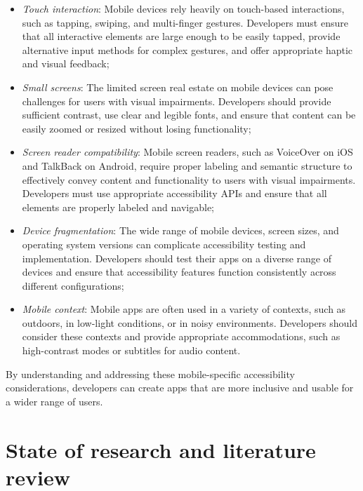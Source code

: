 \begin{itemize}
    \item \textit{Touch interaction}: Mobile devices rely heavily on touch-based interactions, such as tapping, swiping, and multi-finger gestures. Developers must ensure that all interactive elements are large enough to be easily tapped, provide alternative input methods for complex gestures, and offer appropriate haptic and visual feedback;
    
    \item \textit{Small screens}: The limited screen real estate on mobile devices can pose challenges for users with visual impairments. Developers should provide sufficient contrast, use clear and legible fonts, and ensure that content can be easily zoomed or resized without losing functionality;
    
    \item \textit{Screen reader compatibility}: Mobile screen readers, such as VoiceOver on iOS and TalkBack on Android, require proper labeling and semantic structure to effectively convey content and functionality to users with visual impairments. Developers must use appropriate accessibility APIs and ensure that all elements are properly labeled and navigable;
    
    \item \textit{Device fragmentation}: The wide range of mobile devices, screen sizes, and operating system versions can complicate accessibility testing and implementation. Developers should test their apps on a diverse range of devices and ensure that accessibility features function consistently across different configurations;
    
    \item \textit{Mobile context}: Mobile apps are often used in a variety of contexts, such as outdoors, in low-light conditions, or in noisy environments. Developers should consider these contexts and provide appropriate accommodations, such as high-contrast modes or subtitles for audio content.
\end{itemize}

By understanding and addressing these mobile-specific accessibility considerations, developers can create apps that are more inclusive and usable for a wider range of users.

\section{State of research and literature review}
\label{chap:accessibility-literature}

